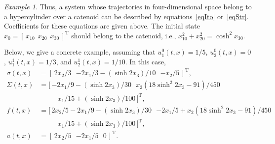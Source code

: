 \documentclass[10pt,reqno]{amsart}
\newcommand{\trans}{{\scriptscriptstyle \mathrm{T}}}
\theoremstyle{plain}
\theoremstyle{remark}
\newtheorem{Example}{Example}
\begin{document}
\begin{Example}
Thus, a system whose trajectories in four-dimensional space belong to a hypercylinder over a catenoid can be described by equations~\eqref{eqIto} or~\eqref{eqStr}. Coefficients for these equations are given above. The initial state $x_0 = [ \, x_{10} \ \ x_{20} \ \ x_{30} \, ]^\trans$ should belong to the catenoid, i.e., $x_{10}^2 + x_{20}^2 = \cosh^2 x_{30}$.

Below, we give a concrete example, assuming that $u_1^0(t,x) = 1/5$, $u_2^0(t,x) = 0$, $u_1^1(t,x) = 1/3$, and $u_2^1(t,x) = 1/10$. In this case,
\begin{align*}
  \sigma(t,x) & = [ \, 2x_2 / 3 \ \ \ {-2x_1 / 3 - (\sinh 2x_3) / 10} \ \ \ {-x_2 / 5} \, ]^\trans, \\
  \Sigma(t,x) & = [ \, {-2x_1/9 - (\sinh 2x_3) / 30} \ \ \ x_2 (18\sinh^2 2x_3 - 91) / 450 \\
  & \ \ \ \ \ \ \ \ \ \ \ \ x_1/15 + (\sinh 2x_3) / 100 \, ]^\trans, \\
  f(t,x) & = [ \, 2x_2 / 5 - 2x_1 / 9 - (\sinh 2x_3) / 30 \ \ \ {-2x_1 / 5 + x_2 (18\sinh^2 2x_3 - 91) / 450} \\
  & \ \ \ \ \ \ \ \ \ \ \ \ x_1/15 + (\sinh 2x_3) / 100 \, ]^\trans, \\
  a(t,x) & = [ \, 2x_2 / 5 \ \ \ {-2x_1 / 5} \ \ \ 0 \, ]^\trans.
\end{align*}


\end{Example}
\end{document}
